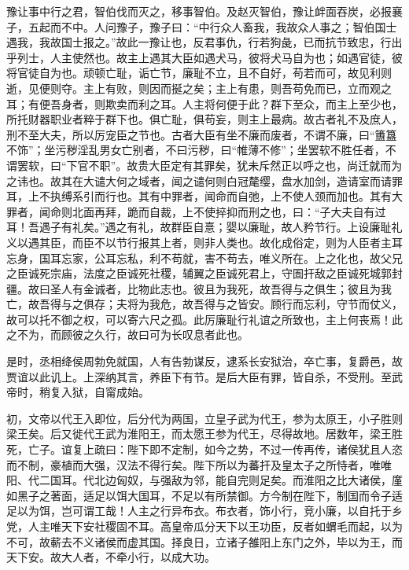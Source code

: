 \documentclass[12pt,UTF8]{ctexbook}
\begin{document}
豫让事中行之君，智伯伐而灭之，移事智伯。及赵灭智伯，豫让衅面吞炭，必报襄子，五起而不中。人问豫子，豫子曰：“中行众人畜我，我故众人事之；智伯国士遇我，我故国士报之。”故此一豫让也，反君事仇，行若狗彘，已而抗节致忠，行出乎列士，人主使然也。故主上遇其大臣如遇犬马，彼将犬马自为也；如遇官徒，彼将官徒自为也。顽顿亡耻，诟亡节，廉耻不立，且不自好，苟若而可，故见利则逝，见便则夺。主上有败，则因而挻之矣；主上有患，则吾苟免而已，立而观之耳；有便吾身者，则欺卖而利之耳。人主将何便于此？群下至众，而主上至少也，所托财器职业者粹于群下也。俱亡耻，俱苟妄，则主上最病。故古者礼不及庶人，刑不至大夫，所以厉宠臣之节也。古者大臣有坐不廉而废者，不谓不廉，曰“簠簋不饰”；坐污秽淫乱男女亡别者，不曰污秽，曰“帷薄不修”；坐罢软不胜任者，不谓罢软，曰“下官不职”。故贵大臣定有其罪矣，犹未斥然正以呼之也，尚迁就而为之讳也。故其在大谴大何之域者，闻之谴何则白冠氂缨，盘水加剑，造请室而请罪耳，上不执缚系引而行也。其有中罪者，闻命而自弛，上不使人颈而加也。其有大罪者，闻命则北面再拜，跪而自裁，上不使捽抑而刑之也，曰：“子大夫自有过耳！吾遇子有礼矣。”遇之有礼，故群臣自憙；婴以廉耻，故人矜节行。上设廉耻礼义以遇其臣，而臣不以节行报其上者，则非人类也。故化成俗定，则为人臣者主耳忘身，国耳忘家，公耳忘私，利不苟就，害不苟去，唯义所在。上之化也，故父兄之臣诚死宗庙，法度之臣诚死社稷，辅翼之臣诚死君上，守圄扞敌之臣诚死城郭封疆。故曰圣人有金诚者，比物此志也。彼且为我死，故吾得与之俱生；彼且为我亡，故吾得与之俱存；夫将为我危，故吾得与之皆安。顾行而忘利，守节而仗义，故可以托不御之权，可以寄六尺之孤。此厉廉耻行礼谊之所致也，主上何丧焉！此之不为，而顾彼之久行，故曰可为长叹息者此也。



是时，丞相绛侯周勃免就国，人有告勃谋反，逮系长安狱治，卒亡事，复爵邑，故贾谊以此讥上。上深纳其言，养臣下有节。是后大臣有罪，皆自杀，不受刑。至武帝时，稍复入狱，自甯成始。



初，文帝以代王入即位，后分代为两国，立皇子武为代王，参为太原王，小子胜则梁王矣。后又徙代王武为淮阳王，而太愿王参为代王，尽得故地。居数年，梁王胜死，亡子。谊复上疏曰：陛下即不定制，如今之势，不过一传再传，诸侯犹且人恣而不制，豪植而大强，汉法不得行矣。陛下所以为蕃扞及皇太子之所恃者，唯唯阳、代二国耳。代北边匈奴，与强敌为邻，能自完则足矣。而淮阳之比大诸侯，廑如黑子之著面，适足以饵大国耳，不足以有所禁御。方今制在陛下，制国而令子适足以为饵，岂可谓工哉！人主之行异布衣。布衣者，饰小行，竞小廉，以自托于乡党，人主唯天下安社稷固不耳。高皇帝瓜分天下以王功臣，反者如蝟毛而起，以为不可，故蔪去不义诸侯而虚其国。择良日，立诸子雒阳上东门之外，毕以为王，而天下安。故大人者，不牵小行，以成大功。
\end{document}
